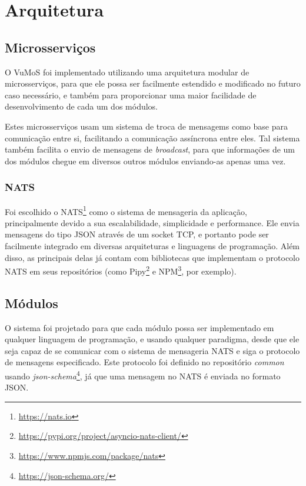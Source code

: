 \chapter{Arquitetura}
\label{cap:arquitetura}

\section{Microsserviços}

    O VuMoS foi implementado utilizando uma arquitetura modular de microsserviços, para que ele possa ser facilmente estendido e modificado no futuro caso necessário, e também para proporcionar uma maior facilidade de desenvolvimento de cada um dos módulos.
    
    Estes microsserviços usam um sistema de troca de mensagems como base para comunicação entre si, facilitando a comunicação assíncrona entre eles. Tal sistema também facilita o envio de mensagens de \textit{broadcast}, para que informações de um dos módulos chegue em diversos outros módulos enviando-as apenas uma vez. 
    
    
    \subsection{NATS}
    
    Foi escolhido o NATS\footnote{\url{https://nats.io}} como o sistema de mensageria da aplicação, principalmente devido a sua escalabilidade, simplicidade e performance. Ele envia mensagens do tipo JSON através de um socket TCP, e portanto pode ser facilmente integrado em diversas arquiteturas e linguagens de programação. Além disso, as principais delas já contam com bibliotecas que implementam o protocolo NATS em seus repositórios (como Pipy\footnote{\url{https://pypi.org/project/asyncio-nats-client/}} e NPM\footnote{\url{https://www.npmjs.com/package/nats}}, por exemplo).
    
    
\section{Módulos}
    
    O sistema foi projetado para que cada módulo possa ser implementado em qualquer linguagem de programação, e usando qualquer paradigma, desde que ele seja capaz de se comunicar com o sistema de mensageria NATS e siga o protocolo de mensagens especificado. Este protocolo foi definido no repositório \textit{common} usando \textit{json-schema}\footnote{\url{https://json-schema.org/}}, já que uma mensagem no NATS é enviada no formato JSON. 
    
